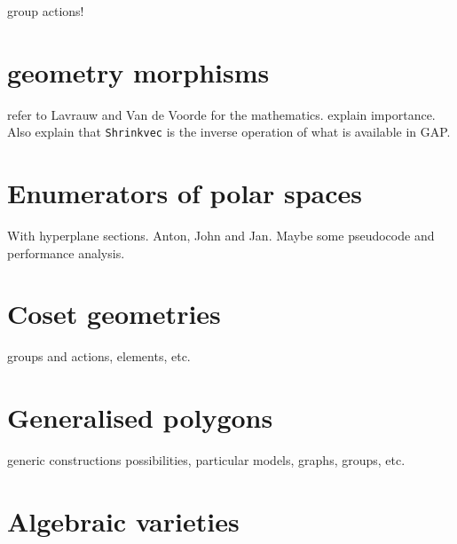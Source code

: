 \documentclass{article}
\begin{document}
group actions!

\section{geometry morphisms}

refer to Lavrauw and Van de Voorde for the mathematics. explain importance. Also explain that \verb+Shrinkvec+ is the inverse operation of what is available in GAP.

\section{Enumerators of polar spaces}
With hyperplane sections. Anton, John and Jan. Maybe some pseudocode and performance analysis.

\section{Coset geometries}

groups and actions, elements, etc.

\section{Generalised polygons}

generic constructions possibilities, particular models, graphs, groups, etc.

\section{Algebraic varieties}


\end{document}

